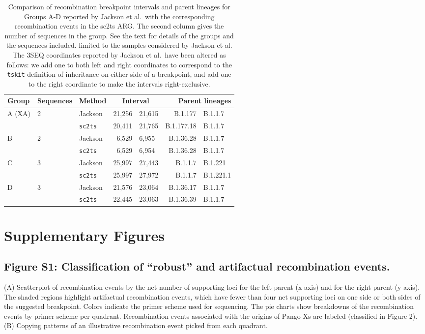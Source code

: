 \documentclass[12pt,letterpaper]{article}
\begin{document}
\begin{table} \centering
\caption{\label{tab:jackson}Comparison of recombination breakpoint
intervals and parent lineages for Groups A-D
reported by Jackson et al.\ with the corresponding
recombination events in the sc2ts ARG.
The second column gives the number of sequences in the group.
See the text for details of the groups and the sequences included.
limited to the samples considered by Jackson et al.
The 3SEQ coordinates
reported by Jackson et al.\ have been altered as follows: we
add one to both left and right coordinates to correspond to the
\texttt{tskit} definition of inheritance on either side of a breakpoint,
and add one to the right coordinate to make the intervals
right-exclusive. }
\begin{tabular}{lllr@{--}lr@{+}l}
\toprule
Group        & Sequences & Method & \multicolumn{2}{c}{Interval}
    & \multicolumn{2}{r}{Parent lineages} \\
\midrule
A (XA)       & 2   & Jackson        &  21,256&21,615 & B.1.177&B.1.1.7 \\
             &     &\texttt{sc2ts} &  20,411&21,765 & B.1.177.18&B.1.1.7 \\
\cmidrule{3-7}
B            & 2   & Jackson        &  6,529&6,955 & B.1.36.28&B.1.1.7  \\
             &     &\texttt{sc2ts} &   6,529&6,954 & B.1.36.28&B.1.1.7  \\
\cmidrule{3-7}
C            & 3   &Jackson         &  25,997&27,443 &  B.1.1.7&B.1.221 \\
             &     & \texttt{sc2ts} &  25,997&27,972 &  B.1.1.7&B.1.221.1 \\
\cmidrule{3-7}
D            & 3   & Jackson        &  21,576&23,064 &  B.1.36.17&B.1.1.7 \\
             &     & \texttt{sc2ts} &  22,445&23,063 &  B.1.36.39&B.1.1.7 \\
\bottomrule
\end{tabular}
\end{table}


\section*{Supplementary Figures}

\subsection*{Figure S1: Classification of “robust” and artifactual recombination events.}
(A) Scatterplot of recombination events by the net number of supporting loci for the left parent (x-axis) and for the right parent (y-axis).
The shaded regions highlight artifactual recombination events,
which have fewer than four net supporting loci on one side or both sides of the suggested breakpoint.
Colors indicate the primer scheme used for sequencing.
The pie charts show breakdowns of the recombination events by primer scheme per quadrant.
Recombination events associated with the origins of Pango Xs are labeled (classified in Figure 2).
(B) Copying patterns of an illustrative recombination event picked from each quadrant.
\end{document}
